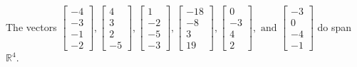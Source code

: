 \begin{exercise}
\begin{exerciseStatement}
  \end{exerciseStatement}
  \begin{exerciseAnswer}
   The vectors \(\left[\begin{array}{r}
-4 \\
-3 \\
-1 \\
-2
\end{array}\right] , \left[\begin{array}{r}
4 \\
3 \\
2 \\
-5
\end{array}\right] , \left[\begin{array}{r}
1 \\
-2 \\
-5 \\
-3
\end{array}\right] , \left[\begin{array}{r}
-18 \\
-8 \\
3 \\
19
\end{array}\right] , \left[\begin{array}{r}
0 \\
-3 \\
4 \\
2
\end{array}\right] , \text{ and } \left[\begin{array}{r}
-3 \\
0 \\
-4 \\
-1
\end{array}\right]\) 
  	 do  
	span \(\mathbb{R}^4\).
  


  \end{exerciseAnswer}
\end{exercise}